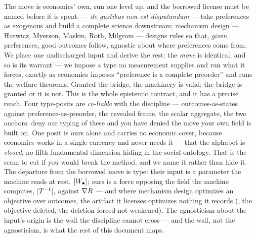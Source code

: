 \documentclass[../main]{subfiles}
\begin{document}
\begin{econ}[label=e:input, title={The borrowed move, one level up},
  ref=gen:will, cites={a:degustibus,a:mechdesign}, departs=annex,
  stopsat={annexes the readable; cannot host a moving input or reach the rate at rest}]
  The move is economics' own, run one level up, and the borrowed license must be named
  before it is spent. \textcite{a:degustibus} --- \emph{de gustibus non est disputandum}
  --- take preferences as exogenous and build a complete science downstream; mechanism
  design --- Hurwicz, Myerson, Maskin, Roth, Milgrom \parencite{a:mechdesign} --- designs
  rules so that, \emph{given} preferences, good outcomes follow, agnostic about where
  preferences come from. We place one undischarged input  and derive the rest:
  the \emph{move} is identical, and so is its warrant --- we impose a type no measurement
  supplies and run what it forces, exactly as economics imposes ``preference is a complete
  preorder'' and runs the welfare theorems. Granted the bridge, the machinery is valid; the
  bridge is granted or it is not. This is the whole epistemic contract, and it has a precise
  reach. Four type-posits are \emph{co-liable} with the discipline --- outcomes-as-states
  against preference-as-preorder, the revealed frame, the scalar aggregate, the two anchors:
  deny our typing of these and you have denied the move your own field is built on. One
  posit is ours alone and carries no economic cover, because economics works in a single
  currency and never needs it --- that the alphabet  is \emph{closed}, no
  fifth fundamental dimension hiding in the social ontology. That is the seam to cut if you
  would break the method, and we name it rather than hide it. The departure from the
  borrowed move is type: their input is a parameter the machine reads at rest, $[W\sb{\bullet}]$;
  ours is a force opposing the field the machine computes, $[T\sp{-1}]$, against
  $\nabla R$ --- and where mechanism design optimizes an objective over outcomes,
  the artifact it licenses optimizes nothing it records (, the objective
  deleted, the deletion forced not weakened). The agnosticism about the input's origin is
  the wall the discipline cannot cross --- and the wall, not the agnosticism, is what the
  rest of this document maps.
\end{econ}
\end{document}
